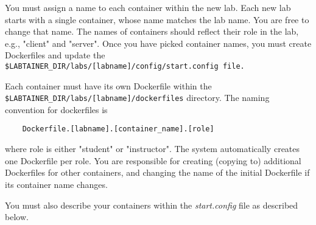 \documentclass{article}
\begin{document}
You must assign a name to each container within the new lab.  Each new lab
starts with a single container, whose name matches the lab name.  You are free
to change that name. The names of containers should reflect their role in the lab,
e.g., "client" and "server".  Once you have picked container names, you must create
Dockerfiles and update the \verb!$LABTAINER_DIR/labs/[labname]/config/start.config file.!

Each container must have its own Dockerfile within the \verb!$LABTAINER_DIR/labs/[labname]/dockerfiles!
directory.  The naming convention for dockerfiles is
\begin{verbatim}
    Dockerfile.[labname].[container_name].[role]
\end{verbatim}
where role is either "student" or "instructor".  The system automatically creates one Dockerfile
per role.  You are responsible for creating (copying to) additional Dockerfiles for other containers,
and changing the name of the initial Dockerfile if its container name changes.

You must also describe your containers within the \textit{start.config} file as described below.
\end{document}
